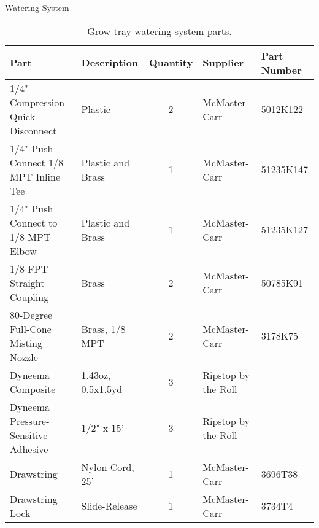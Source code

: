 \uline{Watering System}
\begin{table}[!ht]
    \centering
    \begin{tabular}{|l|l|c|l|l|}
    \hline
        Part                                    & Description           & Quantity  & Supplier              & Part Number   \\ \hline
        1/4" Compression Quick-Disconnect       & Plastic               & 2         & McMaster-Carr         & 5012K122      \\ \hline
        1/4" Push Connect 1/8 MPT Inline Tee    & Plastic and Brass     & 1         & McMaster-Carr         & 51235K147     \\ \hline
        1/4" Push Connect to 1/8 MPT Elbow      & Plastic and Brass     & 1         & McMaster-Carr         & 51235K127     \\ \hline
        1/8 FPT Straight Coupling               & Brass                 & 2         & McMaster-Carr         & 50785K91      \\ \hline
        80-Degree Full-Cone Misting Nozzle      & Brass, 1/8 MPT        & 2         & McMaster-Carr         & 3178K75       \\ \hline
        Dyneema Composite                       & 1.43oz, 0.5x1.5yd     & 3         & Ripstop by the Roll   & ~             \\ \hline
        Dyneema Pressure-Sensitive Adhesive     & 1/2" x 15'            & 3         & Ripstop by the Roll   & ~             \\ \hline
        Drawstring                              & Nylon Cord, 25'       & 1         & McMaster-Carr         & 3696T38       \\ \hline
        Drawstring Lock                         & Slide-Release         & 1         & McMaster-Carr         & 3734T4        \\ \hline
    \end{tabular}
    \caption{Grow tray watering system parts.}
    \label{tab:aeroponics_watering_parts}
\end{table}

